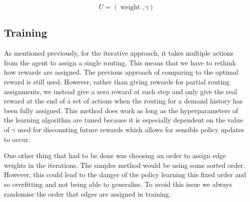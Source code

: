 \begin{equation}
  \label{equation:global_outputs}
  U = (\operatorname{weight}, \gamma)
\end{equation}

\subsection{Training}
As mentioned previously, for the iterative approach, it takes multiple actions from the agent to assign a single routing. This means that we have to rethink how rewards are assigned. The previous approach of comparing to the optimal reward is still used. However, rather than giving rewards for partial routing assignments, we instead give a zero reward at each step and only give the real reward at the end of a set of actions when the routing for a demand history has been fully assigned. This method does work as long as the hyperparameters of the learning algorithm are tuned because it is especially dependent on the value of $\gamma$ used for discounting future rewards which allows for sensible policy updates to occur.

One other thing that had to be done was choosing an order to assign edge weights in the iterations. The simples method would be using some sorted order. However, this could lead to the danger of the policy learning this fixed order and so overfitting and not being able to generalise. To avoid this issue we always randomise the order that edges are assigned in training.

